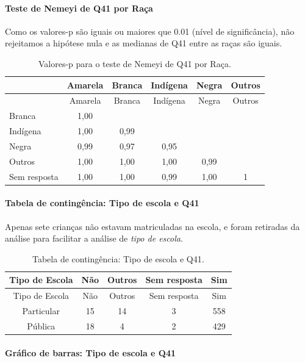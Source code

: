 \documentclass[]{article}
\let\oldparagraph\paragraph
\renewcommand{\paragraph}[1]{\oldparagraph{#1}\mbox{}}
\begin{document}
\hypertarget{teste-de-nemeyi-de-q41-por-rauxe7a}{%
\paragraph{Teste de Nemeyi de Q41 por Raça}\label{teste-de-nemeyi-de-q41-por-rauxe7a}}

Como os valores-p são iguais ou maiores que 0.01 (nível de significância), não rejeitamos a hipótese nula e as medianas de Q41 entre as raças são iguais.

\begin{longtable}[]{@{}lccccc@{}}
\caption{\label{tab:unnamed-chunk-1645}Valores-p para o teste de Nemeyi de Q41 por Raça.}\tabularnewline
\toprule
& Amarela & Branca & Indígena & Negra & Outros\tabularnewline
\midrule
\endfirsthead
\toprule
& Amarela & Branca & Indígena & Negra & Outros\tabularnewline
\midrule
\endhead
Branca & 1,00 & & & &\tabularnewline
Indígena & 1,00 & 0,99 & & &\tabularnewline
Negra & 0,99 & 0,97 & 0,95 & &\tabularnewline
Outros & 1,00 & 1,00 & 1,00 & 0,99 &\tabularnewline
Sem resposta & 1,00 & 1,00 & 0,99 & 1,00 & 1\tabularnewline
\bottomrule
\end{longtable}

\cleardoublepage

\hypertarget{tabela-de-continguxeancia-tipo-de-escola-e-q41}{%
\paragraph{Tabela de contingência: Tipo de escola e Q41}\label{tabela-de-continguxeancia-tipo-de-escola-e-q41}}

Apenas sete crianças não estavam matriculadas na escola, e foram retiradas da análise para facilitar a análise de \emph{tipo de escola}.

\begin{longtable}[]{@{}ccccc@{}}
\caption{\label{tab:unnamed-chunk-1646}Tabela de contingência: Tipo de escola e Q41.}\tabularnewline
\toprule
Tipo de Escola & Não & Outros & Sem resposta & Sim\tabularnewline
\midrule
\endfirsthead
\toprule
Tipo de Escola & Não & Outros & Sem resposta & Sim\tabularnewline
\midrule
\endhead
Particular & 15 & 14 & 3 & 558\tabularnewline
Pública & 18 & 4 & 2 & 429\tabularnewline
\bottomrule
\end{longtable}

\hypertarget{gruxe1fico-de-barras-tipo-de-escola-e-q41}{%
\paragraph{Gráfico de barras: Tipo de escola e Q41}\label{gruxe1fico-de-barras-tipo-de-escola-e-q41}}
\end{document}
